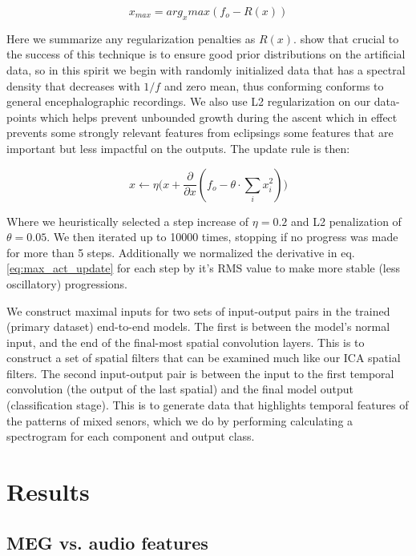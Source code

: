 \documentclass[utf8]{frontiersSCNS} %
\begin{document}
\begin{equation} \label{eq:max_act}
  x_{max} = arg_xmax(f_o - R(x))
\end{equation}

Here we summarize any regularization penalties as $R(x)$. \cite{Yosinski2015} show that crucial to the success of this technique is to ensure good prior distributions on the artificial data, so in this spirit we begin with randomly initialized data that has a spectral density that decreases with $1/f$ and zero mean, thus conforming conforms to general encephalographic recordings. We also use L2 regularization on our data-points which helps prevent unbounded growth during the ascent which in effect prevents some strongly relevant features from eclipsings some features that are important but less impactful on the outputs. The update rule is then:

\begin{equation} \label{eq:max_act_update}
  x \leftarrow \eta \big(x + \frac{\partial }{\partial x}(f_o - \theta \cdot {}\sum_ix_i^2) \big)
\end{equation}

Where we heuristically selected a step increase of $\eta = 0.2$ and L2 penalization of $\theta = 0.05$. We then iterated up to 10000 times, stopping if no progress was made for more than 5 steps. Additionally we normalized the derivative in eq. \ref{eq:max_act_update} for each step by it's RMS value to make more stable (less oscillatory) progressions.

We construct maximal inputs for two sets of input-output pairs in the trained (primary dataset) end-to-end models. The first is between the model's normal input, and the end of the final-most spatial convolution layers. This is to construct a set of spatial filters that can be examined much like our ICA spatial filters. The second input-output pair is between the input to the first temporal convolution (the output of the last spatial) and the final model output (classification stage). This is to generate data that highlights temporal features of the patterns of mixed senors, which we do by performing calculating a spectrogram for each component and output class.

\section{Results}

\subsection{MEG vs. audio features}
\end{document}
